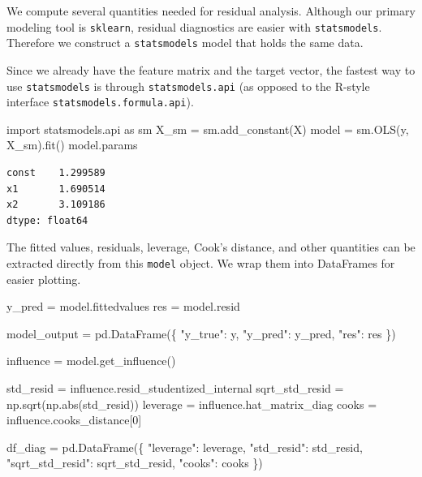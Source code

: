 \documentclass[
  letterpaper,
  DIV=11,
  numbers=noendperiod]{scrreprt}
\newenvironment{Shaded}{\begin{snugshade}}{\end{snugshade}}
\newcommand{\BuiltInTok}[1]{\textcolor[rgb]{0.00,0.23,0.31}{#1}}
\newcommand{\DecValTok}[1]{\textcolor[rgb]{0.68,0.00,0.00}{#1}}
\newcommand{\ImportTok}[1]{\textcolor[rgb]{0.00,0.46,0.62}{#1}}
\newcommand{\NormalTok}[1]{\textcolor[rgb]{0.00,0.23,0.31}{#1}}
\newcommand{\OperatorTok}[1]{\textcolor[rgb]{0.37,0.37,0.37}{#1}}
\newcommand{\StringTok}[1]{\textcolor[rgb]{0.13,0.47,0.30}{#1}}
\theoremstyle{definition}
\theoremstyle{definition}
\theoremstyle{plain}
\theoremstyle{plain}
\theoremstyle{remark}
\begin{document}
We compute several quantities needed for residual analysis. Although our
primary modeling tool is \texttt{sklearn}, residual diagnostics are
easier with \texttt{statsmodels}. Therefore we construct a
\texttt{statsmodels} model that holds the same data.

Since we already have the feature matrix and the target vector, the
fastest way to use \texttt{statsmodels} is through
\texttt{statsmodels.api} (as opposed to the R-style interface
\texttt{statsmodels.formula.api}).

\begin{Shaded}
\begin{Highlighting}[]
\ImportTok{import}\NormalTok{ statsmodels.api }\ImportTok{as}\NormalTok{ sm}
\NormalTok{X\_sm }\OperatorTok{=}\NormalTok{ sm.add\_constant(X)}
\NormalTok{model }\OperatorTok{=}\NormalTok{ sm.OLS(y, X\_sm).fit()}
\NormalTok{model.params}
\end{Highlighting}
\end{Shaded}

\begin{verbatim}
const    1.299589
x1       1.690514
x2       3.109186
dtype: float64
\end{verbatim}

The fitted values, residuals, leverage, Cook's distance, and other
quantities can be extracted directly from this \texttt{model} object. We
wrap them into DataFrames for easier plotting.

\begin{Shaded}
\begin{Highlighting}[]
\NormalTok{y\_pred }\OperatorTok{=}\NormalTok{ model.fittedvalues}
\NormalTok{res }\OperatorTok{=}\NormalTok{ model.resid}

\NormalTok{model\_output }\OperatorTok{=}\NormalTok{ pd.DataFrame(\{}
    \StringTok{"y\_true"}\NormalTok{: y,}
    \StringTok{"y\_pred"}\NormalTok{: y\_pred,}
    \StringTok{"res"}\NormalTok{: res}
\NormalTok{\})}
\end{Highlighting}
\end{Shaded}

\begin{Shaded}
\begin{Highlighting}[]
\NormalTok{influence }\OperatorTok{=}\NormalTok{ model.get\_influence()}

\NormalTok{std\_resid }\OperatorTok{=}\NormalTok{ influence.resid\_studentized\_internal}
\NormalTok{sqrt\_std\_resid }\OperatorTok{=}\NormalTok{ np.sqrt(np.}\BuiltInTok{abs}\NormalTok{(std\_resid))}
\NormalTok{leverage }\OperatorTok{=}\NormalTok{ influence.hat\_matrix\_diag}
\NormalTok{cooks }\OperatorTok{=}\NormalTok{ influence.cooks\_distance[}\DecValTok{0}\NormalTok{]}

\NormalTok{df\_diag }\OperatorTok{=}\NormalTok{ pd.DataFrame(\{}
    \StringTok{"leverage"}\NormalTok{: leverage,}
    \StringTok{"std\_resid"}\NormalTok{: std\_resid,}
    \StringTok{"sqrt\_std\_resid"}\NormalTok{: sqrt\_std\_resid,}
    \StringTok{"cooks"}\NormalTok{: cooks}
\NormalTok{\})}
\end{Highlighting}
\end{Shaded}
\end{document}
